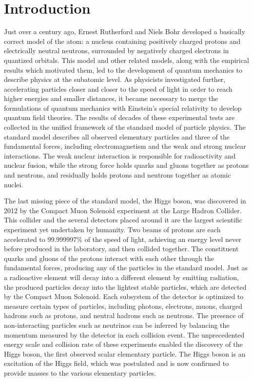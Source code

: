\chapter{Introduction
\label{ch:introduction}}

Just over a century ago, Ernest Rutherford and Niels Bohr developed a basically correct model of the atom: a nucleus containing positively charged protons and electrically neutral neutrons, surrounded by negatively charged electrons in quantized orbitals. This model and other related models, along with the empirical results which motivated them, led to the development of quantum mechanics to describe physics at the subatomic level. As physicists investigated further, accelerating particles closer and closer to the speed of light in order to reach higher energies and smaller distances, it became necessary to merge the formulations of quantum mechanics with Einstein's special relativity to develop quantum field theories. The results of decades of these experimental tests are collected in the unified framework of the standard model of particle physics. The standard model describes all observed elementary particles and three of the fundamental forces, including electromagnetism and the weak and strong nuclear interactions. The weak nuclear interaction is responsible for radioactivity and nuclear fusion, while the strong force holds quarks and gluons together as protons and neutrons, and residually holds protons and neutrons together as atomic nuclei.

The last missing piece of the standard model, the Higgs boson, was discovered in 2012 by the Compact Muon Solenoid experiment at the Large Hadron Collider. This collider and the several detectors placed around it are the largest scientific experiment yet undertaken by humanity. Two beams of protons are each accelerated to 99.999997\% of the speed of light, achieving an energy level never before produced in the laboratory, and then collided together. The constituent quarks and gluons of the protons interact with each other through the fundamental forces, producing any of the particles in the standard model. Just as a radioactive element will decay into a different element by emitting radiation, the produced particles decay into the lightest stable particles, which are detected by the Compact Muon Solenoid. Each subsystem of the detector is optimized to measure certain types of particles, including photons, electrons, muons, charged hadrons such as protons, and neutral hadrons such as neutrons. The presence of non-interacting particles such as neutrinos can be inferred by balancing the momentum measured by the detector in each collision event. The unprecedented energy scale and collision rate of these experiments enabled the discovery of the Higgs boson, the first observed scalar elementary particle. The Higgs boson is an excitation of the Higgs field, which was postulated and is now confirmed to provide masses to the various elementary particles.

